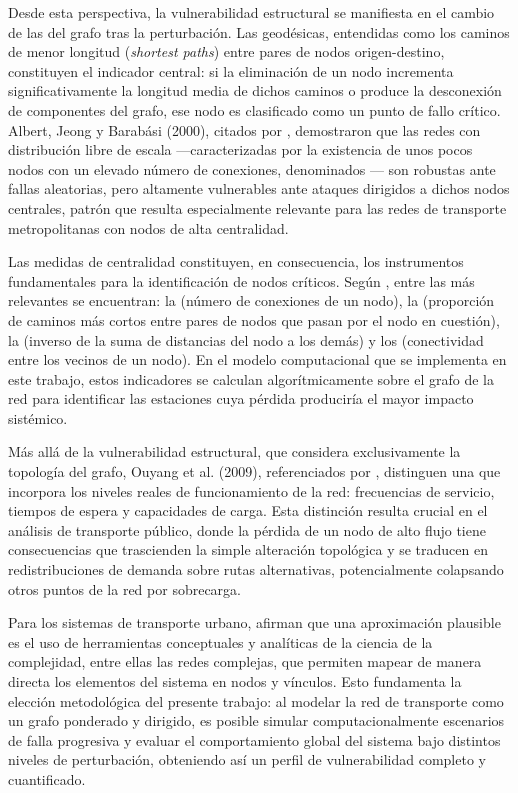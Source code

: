 Desde esta perspectiva, la vulnerabilidad estructural se manifiesta en el cambio de
las  del grafo tras la perturbación. Las geodésicas, entendidas
como los caminos de menor longitud (\textit{shortest paths}) entre pares de nodos
origen-destino, constituyen el indicador central: si la eliminación de un nodo
incrementa significativamente la longitud media de dichos caminos o produce la
desconexión de componentes del grafo, ese nodo es clasificado como un punto de
fallo crítico. Albert, Jeong y Barabási (2000), citados por \textcite{loterovélez2014},
demostraron que las redes con distribución libre de escala ---caracterizadas por la
existencia de unos pocos nodos con un elevado número de conexiones, denominados
--- son robustas ante fallas aleatorias, pero altamente vulnerables ante
ataques dirigidos a dichos nodos centrales, patrón que resulta especialmente
relevante para las redes de transporte metropolitanas con nodos de alta centralidad.

Las medidas de centralidad constituyen, en consecuencia, los instrumentos
fundamentales para la identificación de nodos críticos. Según \textcite{loterovélez2014},
entre las más relevantes se encuentran: la 
(número de conexiones de un nodo), la 
(proporción de caminos más cortos entre pares de nodos que pasan por el nodo en
cuestión), la  (inverso de la suma de distancias del
nodo a los demás) y los  (conectividad entre los
vecinos de un nodo). En el modelo computacional que se implementa en este trabajo,
estos indicadores se calculan algorítmicamente sobre el grafo de la red para
identificar las estaciones cuya pérdida produciría el mayor impacto sistémico.

Más allá de la vulnerabilidad estructural, que considera exclusivamente la topología
del grafo, Ouyang et al. (2009), referenciados por \textcite{loterovélez2014},
distinguen una  que incorpora los niveles reales de
funcionamiento de la red: frecuencias de servicio, tiempos de espera y capacidades
de carga. Esta distinción resulta crucial en el análisis de transporte público, donde la
pérdida de un nodo de alto flujo tiene consecuencias que trascienden la simple
alteración topológica y se traducen en redistribuciones de demanda sobre rutas
alternativas, potencialmente colapsando otros puntos de la red por sobrecarga.

Para los sistemas de transporte urbano, \textcite{loterovélez2014} afirman que una
aproximación plausible es el uso de herramientas conceptuales y analíticas de la
ciencia de la complejidad, entre ellas las redes complejas, que permiten mapear de
manera directa los elementos del sistema en nodos y vínculos. Esto fundamenta la
elección metodológica del presente trabajo: al modelar la red de transporte como un
grafo ponderado y dirigido, es posible simular computacionalmente escenarios de
falla progresiva y evaluar el comportamiento global del sistema bajo distintos niveles
de perturbación, obteniendo así un perfil de vulnerabilidad completo y cuantificado.


